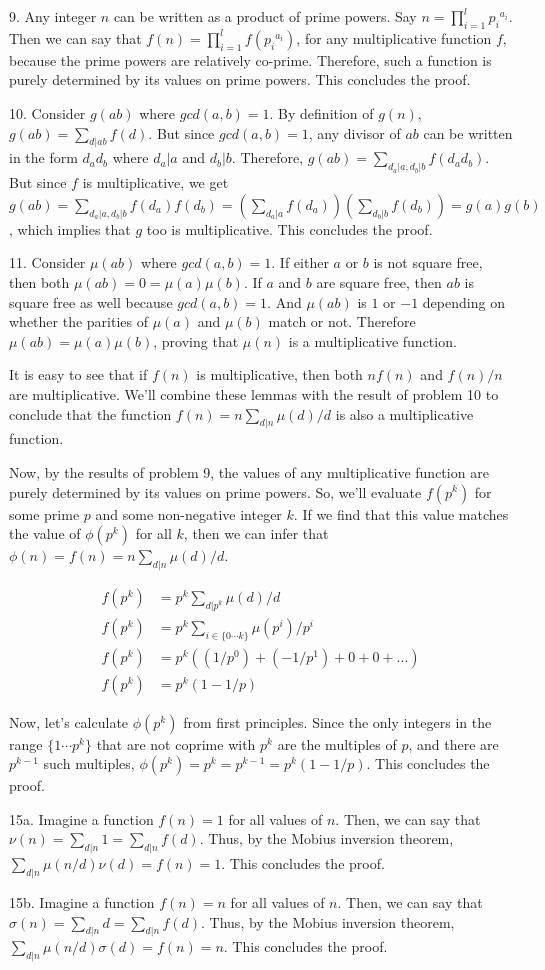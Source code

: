 \documentclass{article}
\begin{document}
9. Any integer $n$ can be written as a product of prime powers. Say $n = \prod_{i = 1}^l {p_i}^{a_i}$. Then we can say that $f(n) = \prod_{i = 1}^l f({p_i}^{a_i})$, for any multiplicative function $f$, because the prime powers are relatively co-prime. Therefore, such a function is purely determined by its values on prime powers. This concludes the proof.

10. Consider $g(ab)$ where $gcd(a, b) = 1$. By definition of $g(n)$, $g(ab) = \sum_{d | ab} f(d)$. But since $gcd(a, b) = 1$, any divisor of $ab$ can be written in the form $d_ad_b$ where $d_a | a$ and $d_b | b$. Therefore, $g(ab) = \sum_{d_a | a, d_b | b} f(d_ad_b)$. But since $f$ is multiplicative, we get $g(ab) = \sum_{d_a | a, d_b | b} f(d_a)f(d_b) = (\sum_{d_a | a} f(d_a))(\sum_{d_b | b} f(d_b)) = g(a)g(b)$, which implies that $g$ too is multiplicative. This concludes the proof.

11. Consider $\mu(ab)$ where $gcd(a, b) = 1$. If either $a$ or $b$ is not square free, then both $\mu(ab) = 0 = \mu(a)\mu(b)$. If $a$ and $b$ are square free, then $ab$ is square free as well because $gcd(a, b) = 1$. And $\mu(ab)$ is $1$ or $-1$ depending on whether the parities of $\mu(a)$ and $\mu(b)$ match or not. Therefore $\mu(ab) = \mu(a)\mu(b)$, proving that $\mu(n)$ is a multiplicative function.

It is easy to see that if $f(n)$ is multiplicative, then both $nf(n)$ and $f(n)/n$ are multiplicative. We'll combine these lemmas with the result of problem 10 to conclude that the function $f(n) = n \sum_{d | n} \mu(d) / d$ is also a multiplicative function.

Now, by the results of problem 9, the values of any multiplicative function are purely determined by its values on prime powers. So, we'll evaluate $f(p^k)$ for some prime $p$ and some non-negative integer $k$. If we find that this value matches the value of $\phi(p^k)$ for all $k$, then we can infer that $\phi(n) = f(n) = n \sum_{d | n} \mu(d) / d$.

\begin{align*}
    f(p^k) &= p^k \sum_{d | p^k} \mu(d) / d \\
    f(p^k) &= p^k \sum_{i \in \{0 \cdots k\}} \mu(p^i) / p^i \\
    f(p^k) &= p^k ((1 / p^0) + (-1 / p^1) + 0 + 0 + ...) \\
    f(p^k) &= p^k (1 - 1 / p)
\end{align*}

Now, let's calculate $\phi(p^k)$ from first principles. Since the only integers in the range $\{1 \cdots p^k\}$ that are not coprime with $p^k$ are the multiples of $p$, and there are $p^{k - 1}$ such multiples, $\phi(p^k) = p^k = p^{k - 1} = p^k(1 - 1 / p)$. This concludes the proof.

15a. Imagine a function $f(n) = 1$ for all values of $n$. Then, we can say that $\nu(n) = \sum_{d | n} 1 = \sum_{d | n} f(d)$. Thus, by the Mobius inversion theorem, $\sum_{d | n} \mu(n/d)\nu(d) = f(n) = 1$. This concludes the proof. 

15b. Imagine a function $f(n) = n$ for all values of $n$. Then, we can say that $\sigma(n) = \sum_{d | n} d = \sum_{d | n} f(d)$. Thus, by the Mobius inversion theorem, $\sum_{d | n} \mu(n/d)\sigma(d) = f(n) = n$. This concludes the proof.
\end{document}
